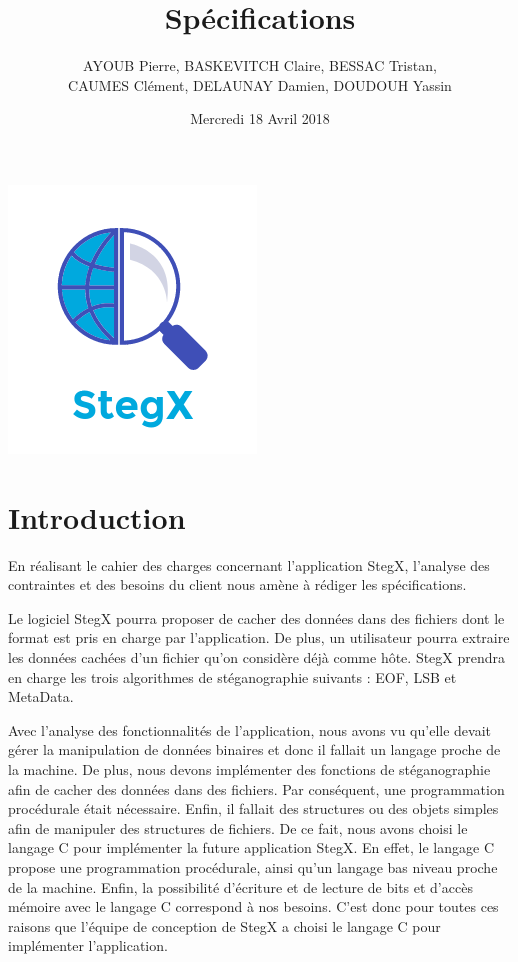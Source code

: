 \documentclass[11pt]{article}
\title{\huge{\textbf Spécifications}}
\author{AYOUB Pierre, BASKEVITCH Claire, BESSAC Tristan, \\
CAUMES Clément, DELAUNAY Damien, DOUDOUH Yassin}
\date{Mercredi 18 Avril 2018}
\begin{document}
\maketitle
\vspace{20em}
\begin{center}\includegraphics{pictures/Application.png}\end{center}
\newpage

\tableofcontents

\newpage

\section{Introduction}

En réalisant le cahier des charges concernant l'application StegX, 
l'analyse des contraintes et des besoins du client nous amène à rédiger 
les spécifications. 

Le logiciel StegX pourra proposer de cacher des données dans des fichiers 
dont le format est pris en charge par l'application. De plus, un utilisateur 
pourra extraire les données cachées d'un fichier qu'on considère déjà comme 
hôte. StegX prendra en charge les trois algorithmes de stéganographie suivants : 
EOF, LSB et MetaData. 

Avec l'analyse des fonctionnalités de l'application, nous avons vu qu'elle 
devait gérer la manipulation de données binaires et donc il fallait un 
langage proche de la machine. 
De plus, nous devons implémenter des fonctions de stéganographie afin de 
cacher des données dans des fichiers. Par conséquent, une programmation 
procédurale était nécessaire. 
Enfin, il fallait des structures ou des objets simples afin de manipuler 
des structures de fichiers. 
De ce fait, nous avons choisi le langage C pour implémenter la future 
application StegX. En effet, le langage C propose une programmation procédurale, 
ainsi qu'un langage bas niveau proche de la machine. Enfin, la possibilité 
d'écriture et de lecture de bits et d'accès mémoire avec le langage C correspond 
à nos besoins. 
C'est donc pour toutes ces raisons que l'équipe de conception de StegX a 
choisi le langage C pour implémenter l'application. 
\end{document}
